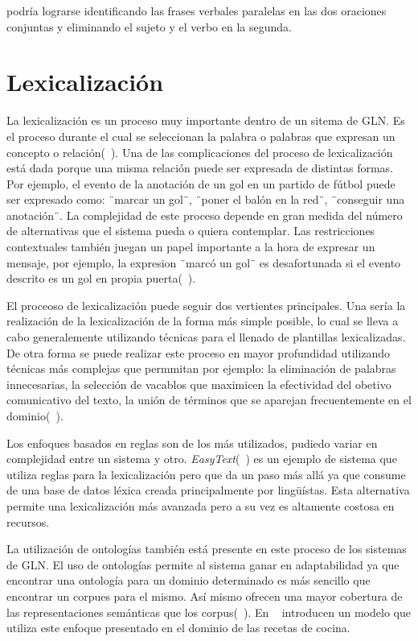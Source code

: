 podría lograrse identificando las frases verbales paralelas en las dos oraciones conjuntas y eliminando el sujeto y el verbo en la segunda.

\section{Lexicalización}

    La lexicalización es un proceso muy importante dentro de un sitema de GLN. Es el proceso durante el cual se 
seleccionan la palabra o palabras que expresan un concepto o relaci\'on(~\cite{Reiter1997BuildingAN}). Una de las 
complicaciones del proceso de lexicalización est\'a dada porque una misma relación puede ser expresada de 
distintas formas. Por ejemplo, el evento de la anotación de un gol en un partido de fútbol puede ser expresado como:
¨marcar un gol¨, ¨poner el balón en la red¨, ¨conseguir una anotación¨. La complejidad de este proceso depende en gran 
medida del número de alternativas que el sistema pueda o quiera contemplar. Las restricciones contextuales también juegan 
un papel importante a la hora de expresar un mensaje, por ejemplo, la expresion ¨marcó un gol¨ es desafortunada si el evento 
descrito es un gol en propia puerta(~\cite{Gatt2018SurveyOT}).

    El proceoso de lexicalización puede seguir dos vertientes principales. Una ser\'ia la realizaci\'on de la  
lexicalización de la forma m\'as simple posible, lo cual se lleva a cabo generalemente utilizando t\'ecnicas para el llenado de 
plantillas lexicalizadas. De otra forma se puede realizar este proceso en mayor profundidad utilizando t\'ecnicas m\'as complejas  
que permmitan por ejemplo: la eliminaci\'on de palabras innecesarias, la selección de vacablos que maximicen la efectividad del obetivo 
comunicativo del texto, la uni\'on de t\'erminos que se aparejan frecuentemente en el dominio(~\cite{Perera2017RecentAI}).

    Los enfoques basados en reglas son de los m\'as utilizados, pudiedo variar en complejidad entre un sistema y otro. \textit{EasyText}(~\cite{danlos2011easytext}) 
es un ejemplo de sistema que utiliza reglas para la lexicalización pero que da un paso m\'as all\'a ya que consume de una base de datos 
l\'exica creada principalmente por lingüístas. Esta alternativa permite una lexicalización m\'as avanzada pero a su vez es altamente 
costosa en recursos.

    La utilizaci\'on de ontolog\'ias tambi\'en est\'a presente en este proceso de los sistemas de GLN. El uso de ontologías permite 
al sistema ganar en adaptabilidad ya que encontrar una ontología para un dominio determinado es más sencillo que encontrar un corpues para 
el mismo. Así mismo ofrecen una mayor cobertura de las representaciones semánticas que los corpus(~\cite{Perera2017RecentAI}). En ~\cite{cimiano2013exploiting} introducen 
un modelo que utiliza este enfoque presentado en el dominio de las recetas de cocina.


